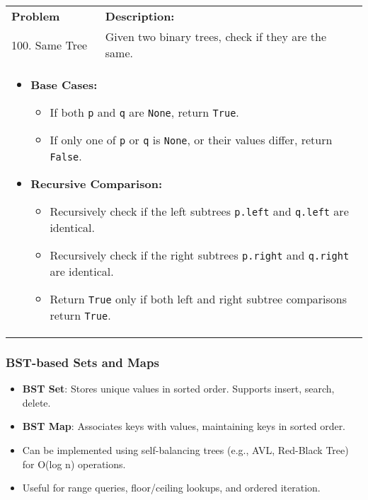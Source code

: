 \begin{summary}
    \begin{center}
        \begin{tabular}{ll}
            \toprule
            \textbf{Problem} & \textbf{Description:} \\
            100. Same Tree & Given two binary trees, check if they are the same. \\
            \multicolumn{2}{p{\linewidth}}{
                \begin{itemize}
                    \item \textbf{Base Cases:}
                    \begin{itemize}
                        \item If both \texttt{p} and \texttt{q} are \texttt{None}, return \texttt{True}.
                        \item If only one of \texttt{p} or \texttt{q} is \texttt{None}, or their values differ, return \texttt{False}.
                    \end{itemize}
                
                    \item \textbf{Recursive Comparison:}
                    \begin{itemize}
                        \item Recursively check if the left subtrees \texttt{p.left} and \texttt{q.left} are identical.
                        \item Recursively check if the right subtrees \texttt{p.right} and \texttt{q.right} are identical.
                        \item Return \texttt{True} only if both left and right subtree comparisons return \texttt{True}.
                    \end{itemize}
                \end{itemize}                
            } \\
            \midrule
            \bottomrule
        \end{tabular}
    \end{center}
\end{summary}

\subsubsection{BST-based Sets and Maps}

\begin{summary}
    \begin{itemize}
        \item \textbf{BST Set}: Stores unique values in sorted order. Supports insert, search, delete.
        \item \textbf{BST Map}: Associates keys with values, maintaining keys in sorted order.
        \item Can be implemented using self-balancing trees (e.g., AVL, Red-Black Tree) for O(log n) operations.
        \item Useful for range queries, floor/ceiling lookups, and ordered iteration.
    \end{itemize}
\end{summary}

